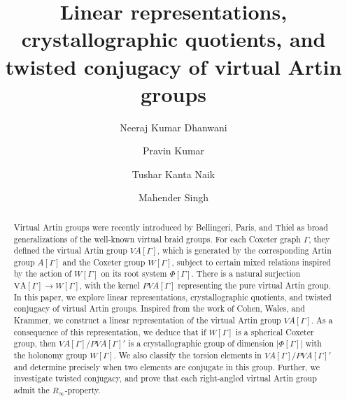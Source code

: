 \documentclass[12pt]{amsart}
\numberwithin{equation}{section}
\begin{document}
\title[Representation and twisted conjugacy of virtual Artin groups]{Linear representations, crystallographic quotients, and twisted conjugacy of virtual Artin groups}


\author{Neeraj Kumar Dhanwani}
\address{Department of Mathematical Sciences, Indian Institute of Science Education and Research (IISER) Mohali, Sector 81,  S. A. S. Nagar, P. O. Manauli, Punjab 140306, India.}

\author{Pravin Kumar}
\address{Department of Mathematical Sciences, Indian Institute of Science Education and Research (IISER) Mohali, Sector 81,  S. A. S. Nagar, P. O. Manauli, Punjab 140306, India.}

\author{Tushar Kanta Naik}
\address{School of Mathematical Sciences, National Institute of Science Education and Research, Bhubaneswar, An OCC of Homi Bhabha National Institute, P. O. Jatni, Khurda 752050, Odisha, India.}
\author{Mahender Singh}
\address{Department of Mathematical Sciences, Indian Institute of Science Education and Research (IISER) Mohali, Sector 81,  S. A. S. Nagar, P. O. Manauli, Punjab 140306, India.}




\begin{abstract}
Virtual Artin groups were recently introduced by Bellingeri, Paris, and Thiel as broad generalizations of the well-known virtual braid groups. For each Coxeter graph $\Gamma$, they defined the virtual Artin group $VA[\Gamma]$, which is generated by the corresponding Artin group $A[\Gamma]$ and the Coxeter group $W[\Gamma]$, subject to certain mixed relations inspired by the action of $W[\Gamma]$ on its root system $\Phi[\Gamma]$. There is a natural surjection  $ \mathrm{VA}[\Gamma] \rightarrow W[\Gamma]$, with the kernel $PVA[\Gamma]$ representing the pure virtual Artin group. In this paper, we explore linear representations, crystallographic quotients, and twisted conjugacy of virtual Artin groups.  Inspired from the work of Cohen, Wales, and Krammer, we construct a linear representation of the virtual Artin group $VA[\Gamma]$. As a consequence of this representation, we deduce that if $W[\Gamma]$ is a spherical Coxeter group, then $VA[\Gamma]/PVA[\Gamma]'$ is a crystallographic group of dimension $ |\Phi[\Gamma]|$ with the holonomy group $W[\Gamma]$. We also classify the torsion elements in $VA[\Gamma]/PVA[\Gamma]'$ and determine precisely when two elements are conjugate in this group. Further, we investigate twisted conjugacy, and prove that each right-angled virtual Artin group admit the $R_\infty$-property.
\end{abstract}
\maketitle
\end{document}
